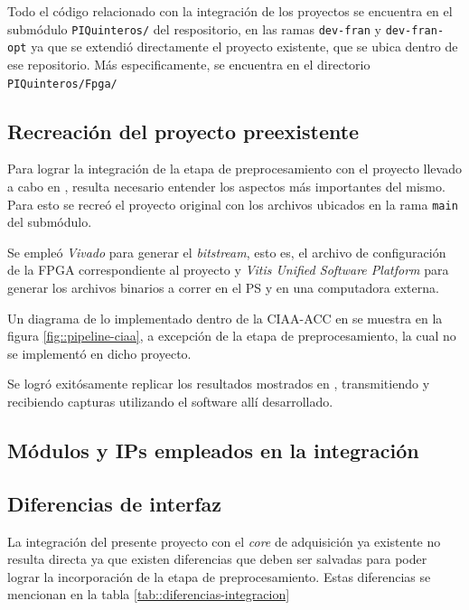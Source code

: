 \documentclass[../../main.tex]{subfiles}
\begin{document}
Todo el código relacionado con la integración de los proyectos se encuentra en el submódulo \texttt{PIQuinteros/} del respositorio, en las ramas \texttt{dev-fran} y \texttt{dev-fran-opt} ya que se extendió directamente el proyecto existente, que se ubica dentro de ese repositorio. Más especificamente, se encuentra en el directorio \texttt{PIQuinteros/Fpga/}

\subsection{Recreación del proyecto preexistente}
Para lograr la integración de la etapa de preprocesamiento con el proyecto llevado a cabo en \cite{proyecto-jose}, resulta necesario entender los aspectos más importantes del mismo. Para esto se recreó el proyecto original con los archivos ubicados en la rama \texttt{main} del submódulo.

Se empleó \textit{Vivado} para generar el \textit{bitstream}, esto es, el archivo de configuración de la FPGA correspondiente al proyecto y \textit{Vitis Unified Software Platform} para generar los archivos binarios a correr en el PS y en una computadora externa.

Un diagrama de lo implementado dentro de la CIAA-ACC en \cite{proyecto-jose} se muestra en la figura \ref{fig::pipeline-ciaa}, a excepción de la etapa de preprocesamiento, la cual no se implementó en dicho proyecto.

Se logró exitósamente replicar los resultados mostrados en \cite{proyecto-jose}, transmitiendo y recibiendo capturas utilizando el software allí desarrollado.

\subsection{Módulos y IPs empleados en la integración}


\subsection{Diferencias de interfaz}
La integración del presente proyecto con el \textit{core} de adquisición ya existente no resulta directa ya que existen diferencias que deben ser salvadas para poder lograr la incorporación de la etapa de preprocesamiento. Estas diferencias se mencionan en la tabla \ref{tab::diferencias-integracion}
\end{document}
